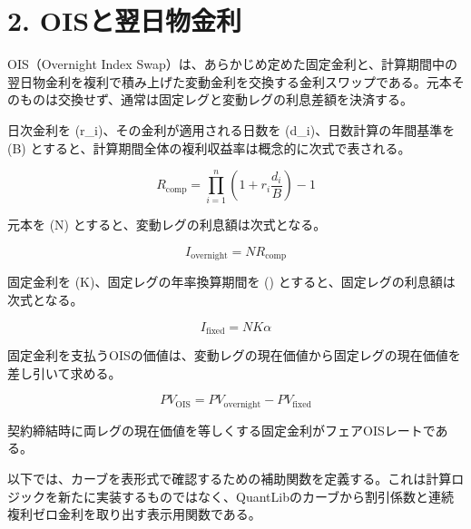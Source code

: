 \documentclass[
  letterpaper,
  DIV=11,
  numbers=noendperiod]{scrreprt}
\begin{document}
\section{2.
OISと翌日物金利}\label{oisux3068ux7fccux65e5ux7269ux91d1ux5229}

OIS（Overnight Index
Swap）は、あらかじめ定めた固定金利と、計算期間中の翌日物金利を複利で積み上げた変動金利を交換する金利スワップである。元本そのものは交換せず、通常は固定レグと変動レグの利息差額を決済する。

日次金利を (r\_i)、その金利が適用される日数を
(d\_i)、日数計算の年間基準を (B)
とすると、計算期間全体の複利収益率は概念的に次式で表される。

\[
R_{\mathrm{comp}}
=
\prod_{i=1}^{n}
\left(
1+r_i\frac{d_i}{B}
\right)-1
\]

元本を (N) とすると、変動レグの利息額は次式となる。

\[
I_{\mathrm{overnight}}
=
N R_{\mathrm{comp}}
\]

固定金利を (K)、固定レグの年率換算期間を (\alpha)
とすると、固定レグの利息額は次式となる。

\[
I_{\mathrm{fixed}}
=
N K \alpha
\]

固定金利を支払うOISの価値は、変動レグの現在価値から固定レグの現在価値を差し引いて求める。

\[
PV_{\mathrm{OIS}}
=
PV_{\mathrm{overnight}}
-
PV_{\mathrm{fixed}}
\]

契約締結時に両レグの現在価値を等しくする固定金利がフェアOISレートである。

以下では、カーブを表形式で確認するための補助関数を定義する。これは計算ロジックを新たに実装するものではなく、QuantLibのカーブから割引係数と連続複利ゼロ金利を取り出す表示用関数である。
\end{document}
